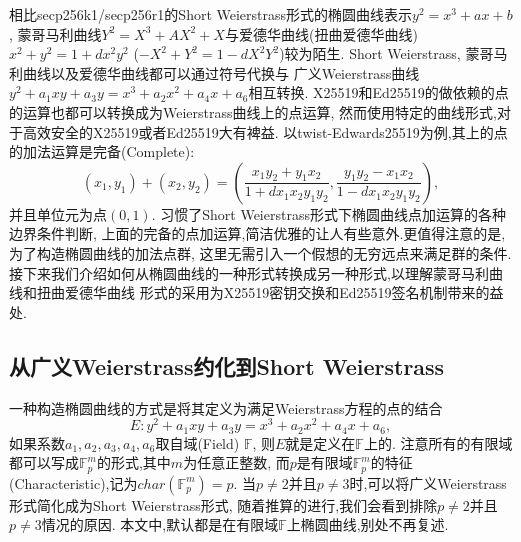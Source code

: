 \documentclass{article}
\newcommand{\F}{\mathbb{F}}
\begin{document}
相比secp256k1/secp256r1的Short Weierstrass形式的椭圆曲线表示$y^2 = x^3 + ax + b$,
蒙哥马利曲线$Y^2 = X^3 + AX^2 + X$与爱德华曲线(扭曲爱德华曲线) 
$x^2+y^2 = 1  + dx^2y^2$ ($-X^2+Y^2 = 1  - dX^2Y^2$)较为陌生.
Short Weierstrass, 蒙哥马利曲线以及爱德华曲线都可以通过符号代换与
广义Weierstrass曲线$y^2 + a_1xy + a_3y = x^3 + a_2x^2 + a_4x + a_6$相互转换.
X25519和Ed25519的做依赖的点的运算也都可以转换成为Weierstrass曲线上的点运算,
然而使用特定的曲线形式,对于高效安全的X25519或者Ed25519大有裨益.
以twist-Edwards25519为例,其上的点的加法运算是完备(Complete):
$$
(x_1, y_1) + (x_2, y_2) = \left( \frac{x_1y_2 + y_1x_2}{1 + dx_1x_2y_1y_2}, \frac{y_1y_2 - x_1x_2}{1-dx_1x_2y_1y_2} \right),
$$
并且单位元为点$(0,1)$. 习惯了Short Weierstrass形式下椭圆曲线点加运算的各种边界条件判断,
上面的完备的点加运算,简洁优雅的让人有些意外.更值得注意的是,为了构造椭圆曲线的加法点群,
这里无需引入一个假想的无穷远点来满足群的条件.
接下来我们介绍如何从椭圆曲线的一种形式转换成另一种形式,以理解蒙哥马利曲线和扭曲爱德华曲线
形式的采用为X25519密钥交换和Ed25519签名机制带来的益处.

\subsection{从广义Weierstrass约化到Short Weierstrass}

一种构造椭圆曲线的方式是将其定义为满足Weierstrass方程的点的结合
\begin{equation}\label{eq-gw}
E: y^2 + a_1xy + a_3y = x^3 + a_2x^2 + a_4x + a_6,
\end{equation}
如果系数$a_1, a_2, a_3, a_4, a_6$取自域(Field) $\F$, 则$E$就是定义在$\F$上的.
注意所有的有限域都可以写成$\F_p^m$的形式,其中$m$为任意正整数,
而$p$是有限域$\F_p^m$的特征(Characteristic),记为$char(\F_p^m)=p$.
当$p\neq 2$并且$p\neq3$时,可以将广义Weierstrass形式简化成为Short Weierstrass形式,
随着推算的进行,我们会看到排除$p\neq 2$并且$p\neq3$情况的原因.
本文中,默认都是在有限域$\F$上椭圆曲线,别处不再复述.
\end{document}
